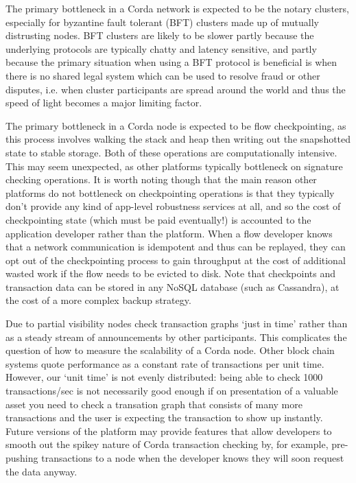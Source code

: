 \documentclass{article}
\begin{document}
The primary bottleneck in a Corda network is expected to be the notary clusters, especially for byzantine fault
tolerant (BFT) clusters made up of mutually distrusting nodes. BFT clusters are likely to be slower partly because the
underlying protocols are typically chatty and latency sensitive, and partly because the primary situation when
using a BFT protocol is beneficial is when there is no shared legal system which can be used to resolve fraud or
other disputes, i.e. when cluster participants are spread around the world and thus the speed of light becomes
a major limiting factor.

The primary bottleneck in a Corda node is expected to be flow checkpointing, as this process involves walking the
stack and heap then writing out the snapshotted state to stable storage. Both of these operations are computationally
intensive. This may seem unexpected, as other platforms typically bottleneck on signature
checking operations. It is worth noting though that the main reason other platforms do not bottleneck
on checkpointing operations is that they typically don't provide any kind of app-level robustness services
at all, and so the cost of checkpointing state (which must be paid eventually!) is accounted to the application
developer rather than the platform. When a flow developer knows that a network communication is idempotent and
thus can be replayed, they can opt out of the checkpointing process to gain throughput at the cost of additional
wasted work if the flow needs to be evicted to disk. Note that checkpoints and transaction data can be stored in
any NoSQL database (such as Cassandra), at the cost of a more complex backup strategy.


Due to partial visibility nodes check transaction graphs `just in time' rather than as a steady stream of
announcements by other participants. This complicates the question of how to measure the scalability of a Corda
node. Other block chain systems quote performance as a constant rate of transactions per unit time.
However, our `unit time' is not evenly distributed: being able to check 1000 transactions/sec is not
necessarily good enough if on presentation of a valuable asset you need to check a transation graph that consists
of many more transactions and the user is expecting the transaction to show up instantly. Future versions of
the platform may provide features that allow developers to smooth out the spikey nature of Corda transaction
checking by, for example, pre-pushing transactions to a node when the developer knows they will soon request
the data anyway.
\end{document}
